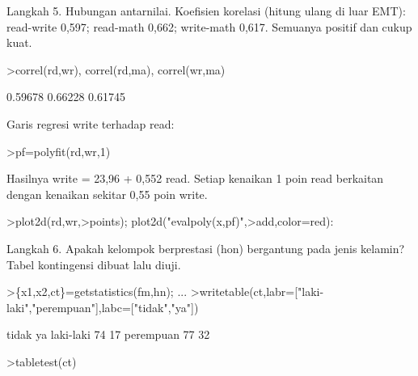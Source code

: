 \documentclass[a4paper,10pt]{article}
\begin{document}
\begin{eulernotebook}
\begin{eulercomment}
\begin{eulercomment}
\begin{eulercomment}
\begin{eulercomment}
\begin{eulercomment}
\begin{eulercomment}
\begin{eulercomment}
\begin{eulercomment}
\begin{eulercomment}
\begin{eulercomment}
\begin{eulercomment}
\begin{eulercomment}
\begin{eulercomment}
\begin{eulercomment}
\begin{eulercomment}
\begin{eulercomment}
\begin{eulercomment}
\begin{eulercomment}
\begin{eulercomment}
\begin{eulercomment}
\begin{eulercomment}
\begin{eulercomment}
\begin{eulercomment}
\begin{eulercomment}
\begin{eulercomment}
\begin{eulercomment}
\begin{eulercomment}
\begin{eulercomment}
\begin{eulercomment}
Langkah 5. Hubungan antarnilai. Koefisien korelasi (hitung ulang di luar EMT): read-write
0,597; read-math 0,662; write-math 0,617. Semuanya positif dan cukup kuat.
\end{eulercomment}
\begin{eulerprompt}
>correl(rd,wr), correl(rd,ma), correl(wr,ma)
\end{eulerprompt}
\begin{euleroutput}
  0.59678
  0.66228
  0.61745
\end{euleroutput}
\begin{eulercomment}
Garis regresi write terhadap read:
\end{eulercomment}
\begin{eulerprompt}
>pf=polyfit(rd,wr,1)
\end{eulerprompt}
\begin{euleroutput}
  [23.959,  0.55171]
\end{euleroutput}
\begin{eulercomment}
Hasilnya write = 23,96 + 0,552 read. Setiap kenaikan 1 poin read berkaitan dengan kenaikan
sekitar 0,55 poin write.
\end{eulercomment}
\begin{eulerprompt}
>plot2d(rd,wr,>points); plot2d("evalpoly(x,pf)",>add,color=red):
\end{eulerprompt}
\begin{eulercomment}
Langkah 6. Apakah kelompok berprestasi (hon) bergantung pada jenis kelamin? Tabel
kontingensi dibuat lalu diuji.
\end{eulercomment}
\begin{eulerprompt}
>\{x1,x2,ct\}=getstatistics(fm,hn); ...
>writetable(ct,labr=["laki-laki","perempuan"],labc=["tidak","ya"])
\end{eulerprompt}
\begin{euleroutput}
                 tidak        ya
   laki-laki        74        17
   perempuan        77        32
\end{euleroutput}
\begin{eulerprompt}
>tabletest(ct)
\end{eulerprompt}

\end{eulercomment}
\end{eulercomment}
\end{eulercomment}
\end{eulercomment}
\end{eulercomment}
\end{eulercomment}
\end{eulercomment}
\end{eulercomment}
\end{eulercomment}
\end{eulercomment}
\end{eulercomment}
\end{eulercomment}
\end{eulercomment}
\end{eulercomment}
\end{eulercomment}
\end{eulercomment}
\end{eulercomment}
\end{eulercomment}
\end{eulercomment}
\end{eulercomment}
\end{eulercomment}
\end{eulercomment}
\end{eulercomment}
\end{eulercomment}
\end{eulercomment}
\end{eulercomment}
\end{eulercomment}
\end{eulercomment}
\end{eulernotebook}
\end{document}
